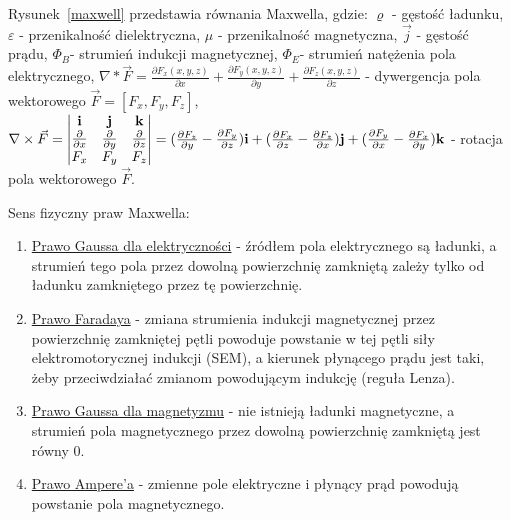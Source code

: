 Rysunek~\ref{maxwell} przedstawia równania Maxwella, gdzie:\newline
$ \varrho $ - gęstość ładunku,\newline
$ \varepsilon $ - przenikalność dielektryczna,\newline
$ \mu $ - przenikalność magnetyczna,\newline
$ \vec{j} $ - gęstość prądu,\newline
$ \Phi_B $- strumień indukcji magnetycznej,\newline
$ \Phi_E $- strumień natężenia pola elektrycznego,\newline
$ \nabla * \vec{F} = \frac{\partial F_x(x,y,z)}{\partial x} + \frac{\partial F_y(x,y,z)}{\partial y} + \frac{\partial F_z(x,y,z)}{\partial z}$ - dywergencja pola wektorowego $ \vec{F} = [F_x, F_y, F_z] $,\newline
$
\nabla \times \vec{F} = 
\begin{vmatrix}
\textbf{i} & \textbf{j} & \textbf{k} \\ 
\frac{\partial}{\partial x} & \frac{\partial}{\partial y} & \frac{\partial}{\partial z} \\ 
F_x & F_y & F_z  \notag
\end{vmatrix}
= (\frac{\partial F_z}{\partial y} - \frac{\partial F_y}{\partial z})\textbf{i} + (\frac{\partial F_x}{\partial z} - \frac{\partial F_z}{\partial x})\textbf{j} + (\frac{\partial F_y}{\partial x} - \frac{\partial F_x}{\partial y})\textbf{k}
$ - rotacja pola wektorowego $ \vec{F} $.\newline

Sens fizyczny praw Maxwella:
\begin{enumerate}[1)]
	\item \underline{Prawo Gaussa dla elektryczności} - źródłem pola elektrycznego są ładunki, a strumień tego pola przez dowolną powierzchnię zamkniętą zależy tylko od ładunku zamkniętego przez tę powierzchnię.
	\item \underline{Prawo Faradaya} - zmiana strumienia indukcji magnetycznej przez powierzchnię zamkniętej pętli powoduje powstanie w tej pętli siły elektromotorycznej indukcji (SEM), a kierunek płynącego prądu jest taki, żeby przeciwdziałać zmianom powodującym indukcję (reguła Lenza).
	\item \underline{Prawo Gaussa dla magnetyzmu} - nie istnieją ładunki magnetyczne, a strumień pola magnetycznego przez dowolną powierzchnię zamkniętą jest równy 0.
	\item \underline{Prawo Ampere'a} - zmienne pole elektryczne i płynący prąd powodują powstanie pola magnetycznego.
\end{enumerate}

